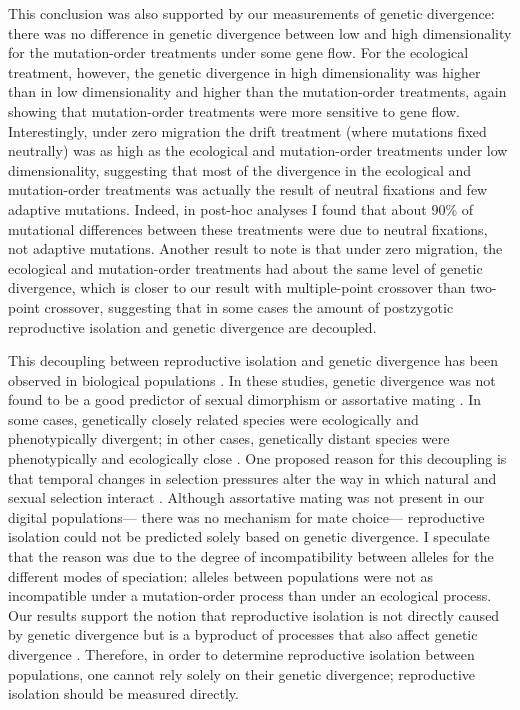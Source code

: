 \begin{doublespace}
This conclusion was also supported by our measurements of genetic divergence:
there was no difference in genetic divergence between low and high
dimensionality for the mutation-order treatments under some gene flow.
%
For the ecological treatment, however, the genetic divergence in high
dimensionality was higher than in low dimensionality and higher than the
mutation-order treatments, again showing that mutation-order treatments were
more sensitive to gene flow.
%
Interestingly, under zero migration the drift treatment (where mutations fixed
neutrally) was as high as the ecological and mutation-order treatments under
low dimensionality, suggesting that most of the divergence in the ecological
and mutation-order treatments was actually the result of neutral fixations and
few adaptive mutations.
%
Indeed, in post-hoc analyses I found that about 90\% of mutational differences
between these treatments were due to neutral fixations, not adaptive mutations.
%
Another result to note is that under zero migration, the ecological and
mutation-order treatments had about the same level of genetic divergence, which
is closer to our result with multiple-point crossover than two-point crossover,
suggesting that in some cases the amount of postzygotic reproductive isolation
and genetic divergence are decoupled.



This decoupling between reproductive isolation and genetic divergence
has been observed in biological populations \citep{ste09,mac12}.
%
In these studies, genetic divergence was not found to be a good predictor
of sexual dimorphism or assortative mating \citep{ste09,mac12}.
%
In some cases, genetically closely related species
were ecologically and phenotypically divergent;
in other cases, genetically distant species
were phenotypically and ecologically close \citep{ste09}.
%
One proposed reason for this decoupling
is that temporal changes in selection pressures
alter the way in which natural and sexual selection interact \citep{mac12}.
%
Although assortative mating was not present in our digital populations---%
there was no mechanism for mate choice---%
reproductive isolation could not be predicted
solely based on genetic divergence.
%
I speculate that the reason was due to the degree of incompatibility
between alleles for the different modes of speciation:
alleles between populations were not as incompatible
under a mutation-order process than under an ecological process.
%
Our results support the notion that reproductive isolation
is not directly caused by genetic divergence but is a byproduct
of processes that also affect genetic divergence \citep{per11}.
%
Therefore, in order to determine reproductive isolation between populations,
one cannot rely solely on their genetic divergence;
reproductive isolation should be measured directly.




\end{doublespace}

